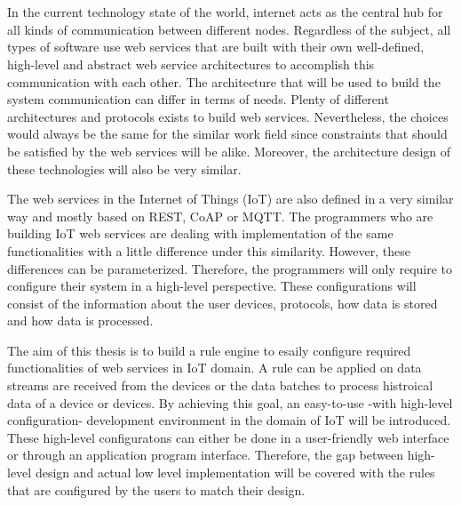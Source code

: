 \chapter{\abstractname}

In the current technology state of the world, internet acts as the central hub for all kinds of communication between different nodes. Regardless of the subject, all types of software use web services that are built with their own well-defined, high-level and abstract web service architectures to accomplish this communication with each other. The architecture that will be used to build the system communication can differ in terms of needs. Plenty of different architectures and protocols exists to build web services. Nevertheless, the choices would always be the same for the similar work field since constraints that should be satisfied by the web services will be alike. Moreover, the architecture design of these technologies will also be very similar.

The web services in the Internet of Things (IoT) are also defined in a very similar way and mostly based on REST, CoAP or MQTT. The programmers who are building IoT web services are dealing with implementation of the same functionalities with a little difference under this similarity. However, these differences can be parameterized. Therefore, the programmers will only require to configure their system in a high-level perspective. These configurations will consist of the information about the user devices,  protocols, how data is stored and how data is processed.

The aim of this thesis is to build a rule engine to esaily configure required functionalities of web services in IoT domain. A rule can be applied on data streams are received from the devices or the data batches to process histroical data of a device or devices. By achieving this goal, an easy-to-use -with high-level configuration- development environment in the domain of IoT will be introduced. These high-level configuratons can either be done in a user-friendly web interface or through an application program interface. Therefore, the gap between high-level design and actual low level implementation will be covered with the rules that are configured by the users to match their design.

